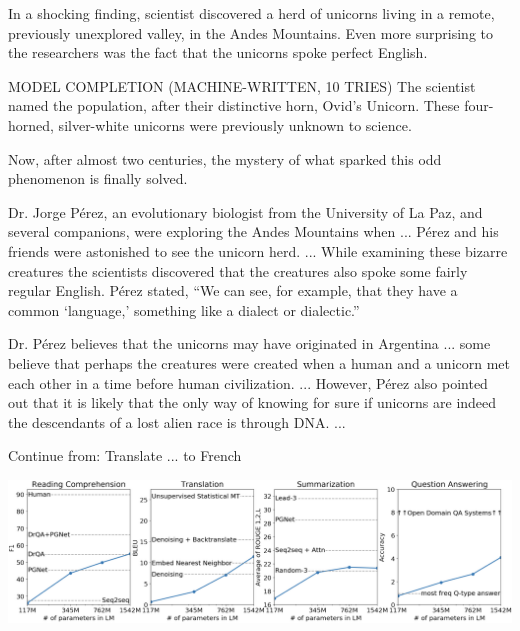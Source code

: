 {\vfil
In a shocking finding, scientist discovered a herd of unicorns living in a remote, previously unexplored valley, in the Andes Mountains. Even more surprising to the researchers was the fact that the unicorns spoke perfect English.


MODEL COMPLETION (MACHINE-WRITTEN, 10 TRIES)
The scientist named the population, after their distinctive horn, Ovid’s Unicorn. These four-horned, silver-white unicorns were previously unknown to science.

Now, after almost two centuries, the mystery of what sparked this odd phenomenon is finally solved.

Dr. Jorge Pérez, an evolutionary biologist from the University of La Paz, and several companions, were exploring the Andes Mountains when ...
Pérez and his friends were astonished to see the unicorn herd. ...
While examining these bizarre creatures the scientists discovered that the creatures also spoke some fairly regular English. Pérez stated, “We can see, for example, that they have a common ‘language,’ something like a dialect or dialectic.”

Dr. Pérez believes that the unicorns may have originated in Argentina ... some believe that perhaps the creatures were created when a human and a unicorn met each other in a time before human civilization. ... However, Pérez also pointed out that it is likely that the only way of knowing for sure if unicorns are indeed the descendants of a lost alien race is through DNA. ...


Continue from: Translate ... to French

\vfill
\centerline{\includegraphics[width = 9in]{../images/GPT-2a}}



}

